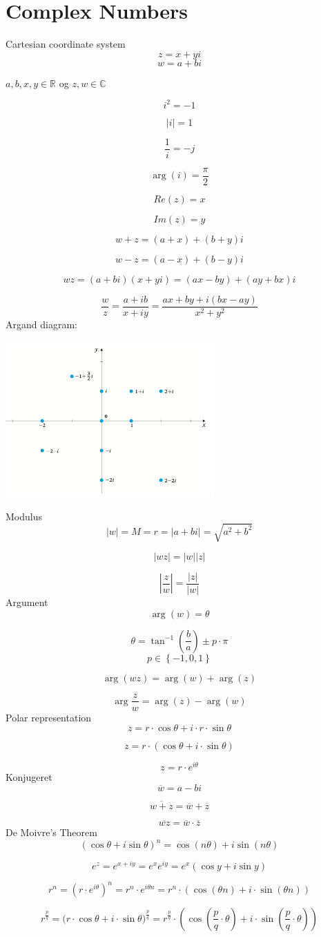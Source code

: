 \section{Complex Numbers}
Cartesian coordinate system
$$z=x+yi$$
$$w=a+bi$$
\begin{center}
    $a,b,x,y\in\mathbb{R}$ og $z,w\in\mathbb{C}$
\end{center}

$$i^2=-1$$

$$\left|  i\right|=1$$

$$\frac{1}{i}=-j$$

$$\arg{(i)}=\frac{\pi}{2}$$ 

$$Re(z)=x$$

$$Im(z)=y$$

$$w+z=(a+x)+(b+y)i$$

$$w-z=(a-x)+(b-y)i$$

$$wz=(a+bi)(x+yi)=(ax-by)+(ay+bx)i$$

$$\frac{w}{z}=\frac{a+ib}{x+iy}=\frac{ax+by+i(bx-ay)}{x^2+y^2}$$
Argand diagram:
\begin{center}
    \includegraphics[width=80mm]{Images/argand-diagram.png}
\end{center}
Modulus
$$\left|w\right|=M=r=\left|a+bi\right|=\sqrt{a^2+b^2}$$

$$\left|wz\right|=\left|w\right|\left|z\right|$$

$$\left|\frac{z}{w}\right|=\frac{\left| z \right|}{\left| w \right|}$$
Argument
$$\arg(w)=\theta$$

$$\theta=\tan^{-1}\left(\frac{b}{a}\right)\pm p\cdot\pi$$
$$p\in\left\{ -1,0,1 \right\} $$

$$\arg{(wz)}=\arg{(w)}+\arg{(z)}$$

$$\arg{\frac{z}{w}}=\arg{(z)}-\arg{(w)}$$
Polar representation
$$z=r\cdot\cos\theta+i\cdot r\cdot \sin{\theta}$$

$$z=r\cdot(\cos\theta+i\cdot \sin{\theta})$$

$$z=r\cdot e^{i\theta}$$
Konjugeret
$$\overline{w}=a-bi$$

$$\overline{w+z}=\overline{w}+\overline{z}$$

$$\overline{wz}=\overline{w}\cdot\overline{z}$$
De Moivre's Theorem
$$(\cos{\theta}+i\sin{\theta})^n=\cos{(n\theta)}+i\sin{(n\theta)}$$

$$e^z=e^{x+iy}=e^{x}e^{iy}=e^{x}(\cos {y}+i\sin{y})$$

$$r^n=(r\cdot e^{i\theta})^n=r^n\cdot e^{i\theta n}=r^n\cdot (\cos{(\theta n)+i\cdot\sin{(\theta n)}})$$

$$r^{\frac{p}{q}}=(r\cdot\cos{\theta+i\cdot\sin{\theta})^{\frac{p}{q}}}=r^{\frac{p}{q}}\cdot(\cos{(\frac{p}{q}\cdot\theta)}+i\cdot\sin{(\frac{p}{q}\cdot\theta)})$$
$$$$
$$$$
$$$$
$$$$
